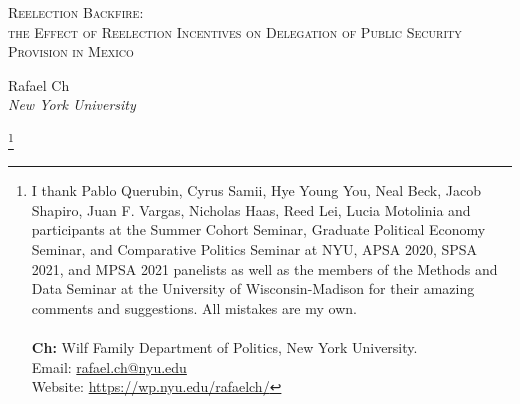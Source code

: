 \documentclass[12pt]{amsart}
\title{}
\numberwithin{equation}{section}
\theoremstyle{definition}
\theoremstyle{definition}
\theoremstyle{definition}
\begin{document}
	\vspace*{3ex minus 1ex}
	\begin{center}
		\Large \textsc{Reelection Backfire: \\ the Effect of Reelection Incentives on Delegation of Public Security Provision in Mexico}%
	\end{center}
	
	
\date{April 22th, 2021} 
\vspace*{3ex minus 1ex}
	\begin{center}
		Rafael Ch\\
		
		\textit{New York University}\\
		
	\end{center}
	 
	\thanks{I thank Pablo Querubin, Cyrus Samii, Hye Young You, Neal Beck, Jacob Shapiro, Juan F. Vargas, Nicholas Haas, Reed Lei, Lucia Motolinia and participants at the Summer Cohort Seminar, Graduate Political Economy Seminar, and Comparative Politics Seminar at NYU, APSA 2020, SPSA 2021, and MPSA 2021 panelists as well as the members of the Methods and Data Seminar at the University of Wisconsin-Madison for their amazing comments and suggestions. All mistakes are my own.
	\\
	 \\ \textbf{Ch:} Wilf Family Department of Politics, New York University. \\ Email: \url{rafael.ch@nyu.edu}
	 \\ Website: \url{https://wp.nyu.edu/rafaelch/}}
		  
\end{document}
